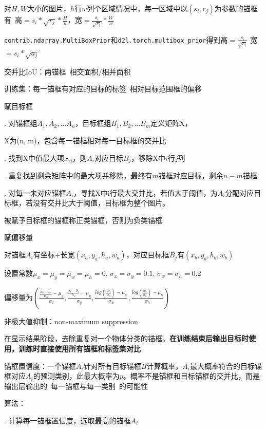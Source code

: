 \documentclass[UTF8]{ctexart}
\begin{document}
  \quad 对$H, W$大小的图片，$h$行$w$列个区域情况中，每一区域中以$(s_i, r_j)$为参数的锚框有\ 高$ = s_i*\sqrt{r_j} * \frac{H}{h}$，宽$ = \frac{s_i}{\sqrt{r_j}} * \frac{W}{w}$

  \quad \quad \texttt{contrib.ndarray.MultiBoxPrior}和\texttt{d2l.torch.multibox\_prior}得到高$=\frac{s_i}{\sqrt{r_j}}$ 宽$ = s_i*\sqrt{a_j}$

  交并比IoU：两锚框\ 相交面积/相并面积

  训练集：每一锚框有对应的目标的标签\ 相对目标范围框的偏移

  \quad 赋目标框

  \quad {}. 对锚框组$A_1, A_2, ...A_n$，目标框组$B_1, B_2, ...B_m$定义矩阵X，

  \quad \quad \quad X为(n, m)，包含每一锚框相对每一目标框的交并比

  \quad {}. 找到X中值最大项$x_{ij}$，则$A_i$对应目标$B_j$，移除X中$i$行$j$列

  \quad {}. 重复找到剩余矩阵中的最大项并移除，最终有$m$锚框对应目标，剩余$n-m$锚框

  \quad {}. 对每一未对应锚框$A_i$，寻找X中i行最大交并比，若值大于阈值，为$A_i$分配对应目标框，若没有交并比大于阈值，目标框为整个图片。

  \quad \quad 被赋予目标框的锚框称正类锚框，否则为负类锚框

  \quad 赋偏移量

  \quad \quad 对锚框$A_i$有坐标+长宽$(x_a, y_a, h_a, w_a)$，对应目标框$B_j$有$(x_b, y_b, h_b, w_b)$

  \quad \quad 设置常数$\mu_x = \mu_y = \mu_w = \mu_h = 0$, $\sigma_x = \sigma_y = 0.1$, $\sigma_w = \sigma_h = 0.2$

  \quad \quad 偏移量为$(\frac{\frac{x_b - x_a}{w_a} - \mu_x}{\sigma_x},\frac{\frac{y_b - y_a}{h_a} - \mu_y}{\sigma_y}, \frac{log(\frac{w_b}{w_a}) - \mu_w}{\sigma_w}, \frac{log(\frac{h_b}{h_a}) - \mu_h}{\sigma_h})$

  非极大值抑制：non-maximum suppression

  \quad 在显示结果阶段，去除重复对一个物体分类的锚框。\textbf{在训练结束后输出目标时使用，训练时直接使用所有锚框和标签集对比}

  \quad 锚框置信度：一个锚框$A_i$针对所有目标锚框$B$计算概率，$A_i$最大概率符合的目标锚框对应$A_i$的预测类别，此最大概率为$p$。概率不是锚框和目标锚框的交并比，而是输出层输出的\ 每一锚框与每一类别\ 的可能性

  \quad 算法：

  \quad {}. 计算每一锚框置信度，选取最高的锚框$A_i$
\end{document}
